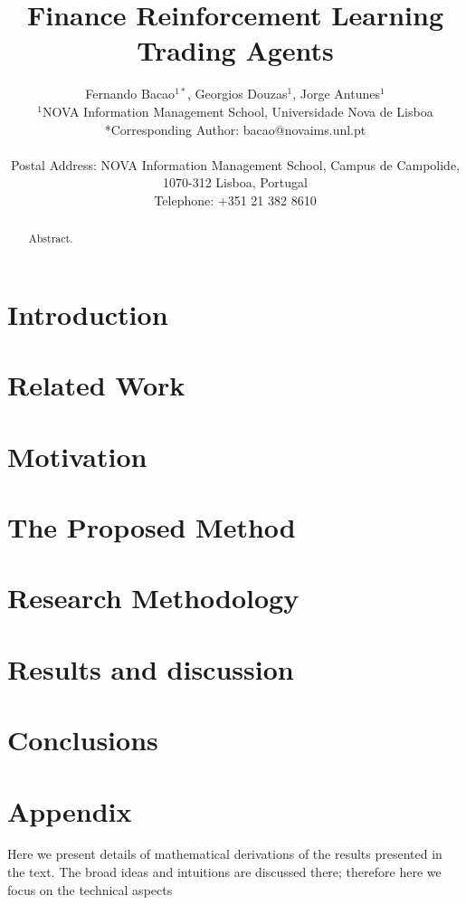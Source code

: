 \documentclass[parskip=full]{scrartcl}
\title{Finance Reinforcement Learning \\ \LARGE{Trading Agents}}
\author{
	Fernando Bacao\(^{1*}\), Georgios Douzas\(^{1}\), Jorge Antunes\(^{1}\)
	\\
	\small{\(^{1}\)NOVA Information Management School, Universidade Nova de Lisboa}
	\\
	\small{*Corresponding Author: bacao@novaims.unl.pt}
	\\
	\\
	\small{Postal Address: NOVA Information Management School, Campus de Campolide, 1070-312 Lisboa, Portugal}
	\\
	\small{Telephone: +351 21 382 8610}
}
\date{}
\begin{document}
\maketitle

\begin{abstract}
Abstract.
\end{abstract}

\section{Introduction}

\section{Related Work}

\section{Motivation}

\section{The Proposed Method}

\section{Research Methodology}

\section{Results and discussion}

\section{Conclusions}

\section{Appendix}

Here we present details of mathematical derivations of the results presented in the
text. The broad ideas and intuitions are discussed there; therefore here we focus on the technical aspects\par

\end{document}
